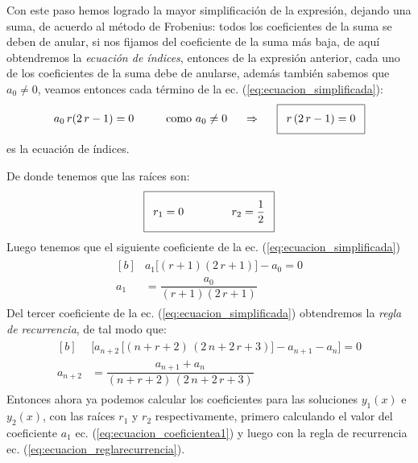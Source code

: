 Con este paso hemos logrado la mayor simplificación de la expresión, dejando una suma, de acuerdo al método de Frobenius: todos los coeficientes de la suma se deben de anular, si nos fijamos del coeficiente de la suma más baja, de aquí obtendremos la \emph{ecuación de índices}, entonces de la expresión anterior, cada uno de los coeficientes de la suma debe de anularse, además también sabemos que $a_{0} \neq 0$, veamos entonces cada término de la ec. (\ref{eq:ecuacion_simplificada}):
\begin{align*}
a_{0} \, r (2 \, r - 1) = 0 \hspace{1cm} \mbox{como } a_{0} \neq 0 \hspace{0.5cm} \Rightarrow \hspace{0.5cm} \addtolength{\fboxsep}{5pt}\boxed{r \, (2 \, r - 1) = 0}
\end{align*}
es la ecuación de índices.
\par
De donde tenemos que las raíces son:
\begin{align*}
\addtolength{\fboxsep}{5pt}\boxed{r_{1} = 0 \hspace{1.5cm} r_{2} = \dfrac{1}{2}}
\end{align*}
Luego tenemos que el siguiente coeficiente de la ec. (\ref{eq:ecuacion_simplificada})
\begin{align}
\begin{aligned}[b]
&a_{1} \big[ (r + 1)(2 \, r + 1) \big] - a_{0} = 0 \\[0.5em]
a_{1} &= \dfrac{a_{0}}{(r + 1)(2 \, r + 1)}
\end{aligned}
\label{eq:ecuacion_coeficientea1}
\end{align}
Del tercer coeficiente de la ec. (\ref{eq:ecuacion_simplificada}) obtendremos la \emph{regla de recurrencia}, de tal modo que:
\begin{align}
\begin{aligned}[b]
&\bigg[ a_{n+2} \, \big[ (n + r + 2) \, (2 \, n + 2 \, r + 3) \big] - a_{n+1} - a_{n} \bigg] = 0 \\[0.5em]
a_{n+2} &= \dfrac{a_{n+1} + a_{n}}{(n + r + 2) \, (2 \, n + 2 \, r + 3)}
\end{aligned}
\label{eq:ecuacion_reglarecurrencia}
\end{align}
Entonces ahora ya podemos calcular los coeficientes para las soluciones $y_{1}(x)$ e $y_{2}(x)$, con las raíces $r_{1}$ y $r_{2}$ respectivamente, primero calculando el valor del coeficiente $a_{1}$ ec. (\ref{eq:ecuacion_coeficientea1}) y luego con la regla de recurrencia ec. (\ref{eq:ecuacion_reglarecurrencia}).
